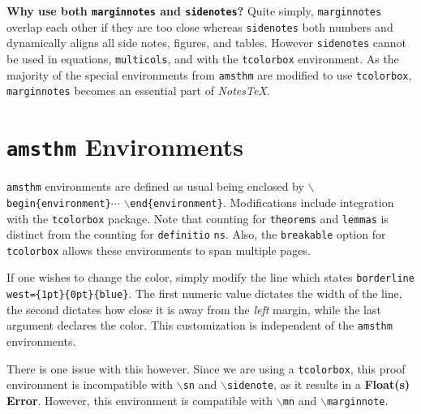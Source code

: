 \documentclass[10pt]{article}
\begin{document}
	\begin{remark}\textbf{Why use both \texttt{marginnotes} and \texttt{sidenotes}?}
		Quite simply, \texttt{marginnotes} overlap each other if they are too close whereas \texttt{sidenotes} both numbers and dynamically aligns all side notes, figures, and tables. However \texttt{sidenotes} cannot be used in equations, \texttt{multicols}, and with the \texttt{tcolorbox} environment. As the majority of the special environments from \texttt{amsthm} are modified to use \texttt{tcolorbox}, \texttt{marginnotes} becomes an essential part of \textit{NotesTeX}.
	\end{remark}


	\section{\texttt{amsthm} Environments}\label{Sub:Special}
	\texttt{amsthm} environments are defined as usual being enclosed by \texttt{$\backslash$begin\{environment\}}$\cdots$ \texttt{$\backslash$end\{environment\}}. Modifications include integration with the \texttt{tcolorbox} package. Note that counting for \texttt{theorems} and \texttt{lemmas} is distinct from the counting for \texttt{definitio} \texttt{ns}. Also, the \texttt{breakable} option for \texttt{tcolorbox} allows these environments to span multiple pages.

	If one wishes to change the color, simply modify the line which states \texttt{borderline west=\{1pt\}}\texttt{\{0pt\}\{blue\}}. The first numeric value dictates the width of the line, the second dictates how close it is away from the \textit{left} margin, while the last argument declares the color. This customization is independent of the \texttt{amsthm} environments.

	There is one issue with this however. Since we are using a \texttt{tcolorbox}, this proof environment is incompatible with \texttt{$\backslash$sn} and \texttt{$\backslash$sidenote}, as it results in a \textbf{Float(s) Error}. However, this environment is compatible with \texttt{$\backslash$mn} and \texttt{$\backslash$marginnote}.
\end{document}
